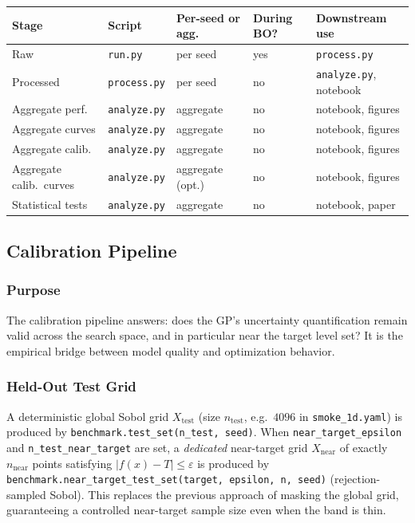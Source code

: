 \documentclass[11pt]{article}
\begin{document}
\begin{center}
\begin{tabular}{lllll}
\toprule
Stage & Script & Per-seed or agg. & During BO? & Downstream use \\
\midrule
Raw & \texttt{run.py} & per seed & yes & \texttt{process.py} \\
Processed & \texttt{process.py} & per seed & no & \texttt{analyze.py}, notebook \\
Aggregate perf.\ & \texttt{analyze.py} & aggregate & no & notebook, figures \\
Aggregate curves & \texttt{analyze.py} & aggregate & no & notebook, figures \\
Aggregate calib.\ & \texttt{analyze.py} & aggregate & no & notebook, figures \\
Aggregate calib.\ curves & \texttt{analyze.py} & aggregate (opt.) & no & notebook, figures \\
Statistical tests & \texttt{analyze.py} & aggregate & no & notebook, paper \\
\bottomrule
\end{tabular}
\end{center}
 
\subsection{Calibration Pipeline}
\label{sec:calibration}
 
\subsubsection{Purpose}
 
The calibration pipeline answers: does the GP's uncertainty quantification remain valid
across the search space, and in particular near the target level set?
It is the empirical bridge between model quality and optimization behavior.
 
\subsubsection{Held-Out Test Grid}
 
A deterministic global Sobol grid $X_{\mathrm{test}}$ (size $n_{\mathrm{test}}$,
e.g.\ $4096$ in \texttt{smoke\_1d.yaml}) is produced by
\texttt{benchmark.test\_set(n\_test, seed)}. When
\texttt{near\_target\_epsilon} and \texttt{n\_test\_near\_target} are set, a
\emph{dedicated} near-target grid $X_{\mathrm{near}}$ of exactly
$n_{\mathrm{near}}$ points satisfying $|f(x)-T|\le\varepsilon$ is produced by
\texttt{benchmark.near\_target\_test\_set(target, epsilon, n, seed)}
(rejection-sampled Sobol). This replaces the previous approach of masking the
global grid, guaranteeing a controlled near-target sample size even when the
band is thin.
\end{document}
